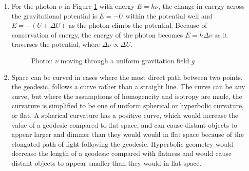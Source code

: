 \documentclass{paper}
\begin{document}
\begin{enumerate}
    \item %
      For the photon \(\nu\) in Figure \ref{fig:field} with energy 
      \(E = h \nu\), the change in energy across the gravitational potential 
      is \(E=-U\) within the potential well and \(E=-(U+\Delta{U})\) as the 
      photon climbs the potential. Because of conservation of energy, the 
      energy of the photon becomes \(E= h \Delta{\nu}\) as it traverses the 
      potential, where \(\Delta{\nu} \propto \Delta{U}\).

      \begin{figure}[!htb]
        \begin{center}
        \end{center}

        \caption{Photon \(\nu\) moving through a uniform gravitation 
          field \(g\)}
        \label{fig:field}
      \end{figure}

    \item %
      Space can be curved in cases where the most direct path between two
      points, the geodesic, follows a curve rather than a straight line. The
      curve can be any surve, but where the assumptions of homogeneity and
      isotropy are made, the curvature is simplified to be one of uniform
      spherical or hyperbolic curvature, or flat. A spherical curvature has
      a positive curve, which would increase the value of a geodesic compared
      to flat space, and can cause distant objects to appear larger and dimmer
      than they would would in flat space because of the elongated path of
      light following the geodesic. Hyperbolic geometry would decrease the 
      length of a geodesic compared with flatness and would cause distant
      objects to appear smaller than they would in flat space.


\end{enumerate}
\end{document}

